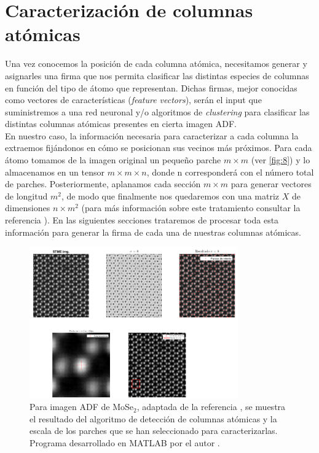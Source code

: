 \section{Caracterización de columnas atómicas}

Una vez conocemos la posición de cada columna atómica, necesitamos generar y asignarles una firma que nos permita clasificar las distintas especies de columnas en función del tipo de átomo que representan. Dichas firmas, mejor conocidas como vectores de características (\textit{feature vectors}), serán el input que suministremos a una red neuronal y/o algoritmos de \textit{clustering} para clasificar las distintas columnas atómicas presentes en cierta imagen ADF.\\

En nuestro caso, la información necesaria para caracterizar a cada columna la extraemos fijándonos en cómo se posicionan sus vecinos más próximos. Para cada átomo tomamos de la imagen original un pequeño parche $m \times m$ (ver \autoref{fig:8}) y lo almacenamos en un tensor $m \times m \times n$, donde n corresponderá con el número total de parches. Posteriormente, aplanamos cada sección $m \times m$ para generar vectores de longitud $m^2$, de modo que finalmente nos quedaremos con una matriz $X$ de dimensiones $n \times m^2$ (para más información sobre este tratamiento consultar la referencia \cite{ml}). En las siguientes secciones trataremos de procesar toda esta información para generar la firma de cada una de nuestras columnas atómicas.

\begin{figure}[h!]
    \centering
    \includegraphics[width=0.8\textwidth]{fig/Fig8.png}
    \caption{Para imagen ADF de MoSe$_2$, adaptada de la referencia \cite{ml}, se muestra el resultado del algoritmo de detección de columnas atómicas y la escala de los parches que se han seleccionado para caracterizarlas. Programa desarrollado en MATLAB por el autor \cite{repo}.}
    \label{fig:8}
\end{figure}

